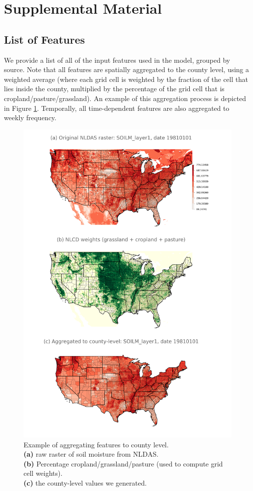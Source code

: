 \section{Supplemental Material}

\subsection{List of Features}

We provide a list of all of the input features used in the model, grouped by source. Note that all features are spatially aggregated to the county level, using a weighted average (where each grid cell is weighted by the fraction of the cell that lies inside the county, multiplied by the percentage of the grid cell that is cropland/pasture/grassland). An example of this aggregation process is depicted in Figure \ref{aggregating_to_county}. Temporally, all time-dependent features are also aggregated to weekly frequency.

\begin{figure}[h]
\centering
\includegraphics[width=0.9\columnwidth]{figs/nldas_SOILM_layer1_19810101_raster_and_weights.png}
\caption{Example of aggregating features to county level. \\
\textbf{(a)} raw raster of soil moisture from NLDAS. \\
\textbf{(b)} Percentage cropland/grassland/pasture (used to compute grid cell weights).\\
\textbf{(c)} the county-level values we generated.}
\label{aggregating_to_county}
\end{figure}


